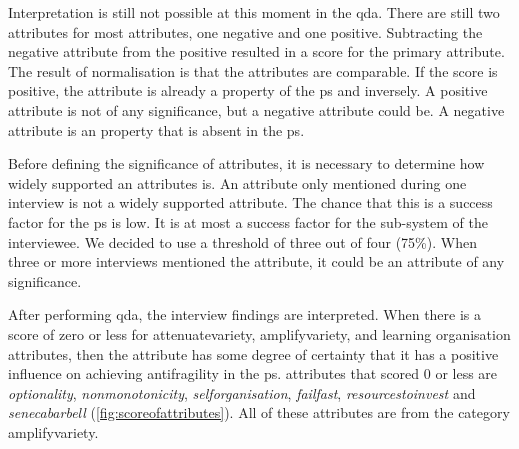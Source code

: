 Interpretation is still not possible at this moment in the \acrshort{qda}. There are still two \glspl{attribute} for most \glspl{attribute}, one negative and one positive. Subtracting the negative \gls{attribute} from the positive resulted in a score for the primary \gls{attribute}. The result of normalisation is that the \glspl{attribute} are comparable. If the score is positive, the \gls{attribute} is already a property of the \gls{ps} and inversely. A positive \gls{attribute} is not of any significance, but a negative \gls{attribute} could be. A negative attribute is an property that is absent in the \gls{ps}.
 
Before defining the significance of \glspl{attribute}, it is necessary to determine how widely supported an \glspl{attribute} is. An \gls{attribute} only mentioned during one interview is not a widely supported \gls{attribute}. The chance that this is a success factor for the \gls{ps} is low. It is at most a success factor for the sub-system of the interviewee. We decided to use a threshold of three out of four (75\%). When three or more interviews mentioned the attribute, it could be an attribute of any significance.

After performing \acrshort{qda}, the interview findings are interpreted. When there is a score of zero or less for \gls{attenuatevariety}, \gls{amplifyvariety}, and learning organisation \glspl{attribute}, then the \gls{attribute} has some degree of certainty that it has a positive influence on achieving \gls{antifragility} in the \gls{ps}. \Glspl{attribute} that scored 0 or less are \textit{\gls{optionality}}, \textit{\gls{nonmonotonicity}}, \textit{\gls{selforganisation}}, \textit{\gls{failfast}}, \textit{\gls{resourcestoinvest}} and \textit{\gls{senecabarbell}} (\cref{fig:scoreofattributes}). All of these \glspl{attribute} are from the category \gls{amplifyvariety}.

